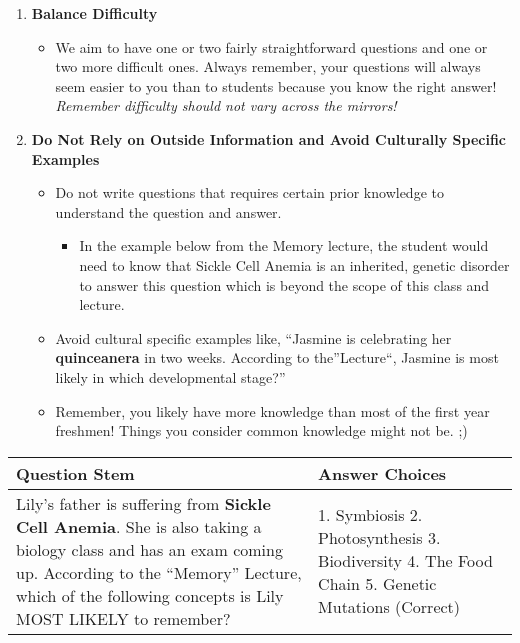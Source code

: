 \documentclass[
]{article}
\providecommand{\tightlist}{%
  \setlength{\itemsep}{0pt}\setlength{\parskip}{0pt}}
\begin{document}
\begin{enumerate}
\def\labelenumi{\arabic{enumi}.}
\setcounter{enumi}{3}
\tightlist
\item
  \textbf{Balance Difficulty}

  \begin{itemize}
  \tightlist
  \item
    We aim to have one or two fairly straightforward questions and one or two more difficult ones. Always remember, your questions will always seem easier to you than to students because you know the right answer! \emph{Remember difficulty should not vary across the mirrors!}
  \end{itemize}
\item
  \textbf{Do Not Rely on Outside Information and Avoid Culturally Specific Examples}

  \begin{itemize}
  \tightlist
  \item
    Do not write questions that requires certain prior knowledge to understand the question and answer.

    \begin{itemize}
    \tightlist
    \item
      In the example below from the Memory lecture, the student would need to know that Sickle Cell Anemia is an inherited, genetic disorder to answer this question which is beyond the scope of this class and lecture.
    \end{itemize}
  \item
    Avoid cultural specific examples like, ``Jasmine is celebrating her \textbf{quinceanera} in two weeks. According to the''Lecture``, Jasmine is most likely in which developmental stage?''
  \item
    Remember, you likely have more knowledge than most of the first year freshmen! Things you consider common knowledge might not be. ;)
  \end{itemize}
\end{enumerate}

\begin{longtable}[]{@{}ll@{}}
\toprule
\begin{minipage}[b]{0.30\columnwidth}\raggedright
\textbf{Question Stem}\strut
\end{minipage} & \begin{minipage}[b]{0.64\columnwidth}\raggedright
\textbf{Answer Choices}\strut
\end{minipage}\tabularnewline
\midrule
\endhead
\begin{minipage}[t]{0.30\columnwidth}\raggedright
Lily's father is suffering from \textbf{Sickle Cell Anemia}. She is also taking a biology class and has an exam coming up. According to the ``Memory'' Lecture, which of the following concepts is Lily MOST LIKELY to remember?\strut
\end{minipage} & \begin{minipage}[t]{0.64\columnwidth}\raggedright
1. Symbiosis 2. Photosynthesis 3. Biodiversity 4. The Food Chain 5. Genetic Mutations (Correct)\strut
\end{minipage}\tabularnewline
\bottomrule
\end{longtable}
\end{document}
